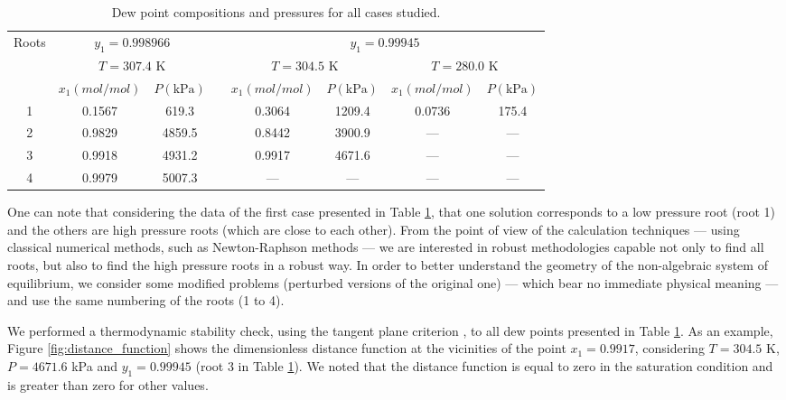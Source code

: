 \documentclass[journal=iecred,manuscript=article]{achemso}
\theoremstyle{definition}
\theoremstyle{remark}
\begin{document}
\begin{table}
\centering
\renewcommand*{\arraystretch}{1.3}
\caption{Dew point compositions and pressures for all cases studied.}
\label{tab:resultados_pontos_orvalho_pressoes}
\begin{tabular}{cccccccc}
\hline\hline
\multirow{3}{*}{Roots} & \multicolumn{2}{c}{$ y_{1} = 0.998966 $} & & \multicolumn{4}{c}{$ y_{1} = 0.99945 $} \\
 & \multicolumn{2}{c}{$ T = 307.4 $ K} & & \multicolumn{2}{c}{$ T = 304.5 $ K} & \multicolumn{2}{c}{$ T = 280.0 $ K} \\ \cline{2-3} \cline{5-8} 
 & $ x_{1} \left( mol / mol \right) $ & $ P \left( \textrm{kPa} \right) $ & & $ x_{1} \left( mol / mol \right) $ & $ P \left( \textrm{kPa} \right) $ & $ x_{1} \left( mol / mol \right) $ & $ P \left( \textrm{kPa} \right) $ \\ \hline
1 & 0.1567 & 619.3 & & 0.3064 & 1209.4 & 0.0736 & 175.4 \\
2 & 0.9829 & 4859.5 & & 0.8442 & 3900.9 & --- & --- \\
3 & 0.9918 & 4931.2 & & 0.9917 & 4671.6 & --- & --- \\
4 & 0.9979 & 5007.3 & & --- & --- & --- & --- \\ \hline\hline
\end{tabular}
\end{table}

One can note that considering the data of the first case presented in Table \ref{tab:resultados_pontos_orvalho_pressoes}, that one solution corresponds to a low pressure root (root 1) and the others are high pressure roots (which are close to each other). From the point of view of the calculation techniques --- using classical numerical methods, such as Newton-Raphson methods --- we are interested in robust methodologies capable not only to find all roots, but also to find  the high pressure roots in a robust way. In order to better understand the geometry of the non-algebraic system of equilibrium, we consider some modified problems (perturbed versions of the original one) --- which bear no immediate physical meaning --- and use the same numbering of the roots (1 to 4).

We performed a thermodynamic stability check, using the tangent plane criterion \citep{michelsen, ngh}, to all dew points presented in Table \ref{tab:resultados_pontos_orvalho_pressoes}. As an example, Figure \ref{fig:distance_function} shows the dimensionless distance function \citep{ngh} at the vicinities of the point $ x_{1} = 0.9917 $, considering $ T = 304.5 $ K, $P = 4671.6$ kPa and $ y_{1} = 0.99945 $ (root 3 in Table \ref{tab:resultados_pontos_orvalho_pressoes}). We noted that the distance function is equal to zero in the saturation condition and is greater than zero for other values.
\end{document}

